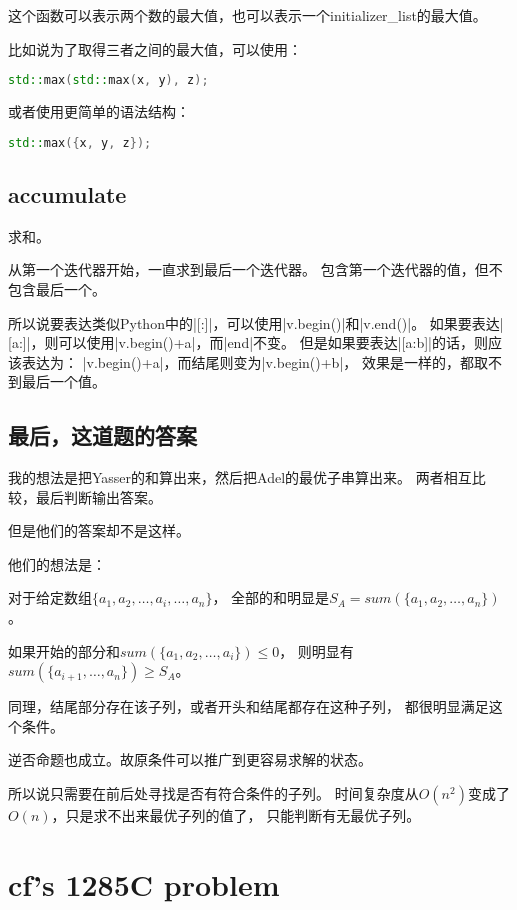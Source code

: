 这个函数可以表示两个数的最大值，也可以表示一个initializer\_list的最大值。

比如说为了取得三者之间的最大值，可以使用：
\begin{lstlisting}[language=C++]
std::max(std::max(x, y), z);
\end{lstlisting}
或者使用更简单的语法结构：
\begin{lstlisting}[language=C++]
std::max({x, y, z});
\end{lstlisting}

\subsection{accumulate}
求和。

从第一个迭代器开始，一直求到最后一个迭代器。
包含第一个迭代器的值，但不包含最后一个。

所以说要表达类似Python中的\vb|[:]|，可以使用\vb|v.begin()|和\vb|v.end()|。
如果要表达\vb|[a:]|，则可以使用\vb|v.begin()+a|，而\vb|end|不变。
但是如果要表达\vb|[a:b]|的话，则应该表达为：
\vb|v.begin()+a|，而结尾则变为\vb|v.begin()+b|，
效果是一样的，都取不到最后一个值。

\subsection{最后，这道题的答案}
我的想法是把Yasser的和算出来，然后把Adel的最优子串算出来。
两者相互比较，最后判断输出答案。

但是他们的答案却不是这样。

他们的想法是：

对于给定数组$\{a_1, a_2, \ldots, a_i, \ldots, a_n\}$，
全部的和明显是$S_A = sum(\{a_1, a_2, \ldots, a_n\})$。

如果开始的部分和$sum(\{a_1, a_2, \ldots, a_i\}) \le 0$，
则明显有$sum(\{a_{i+1}, \ldots, a_n\}) \ge S_A$。

同理，结尾部分存在该子列，或者开头和结尾都存在这种子列，
都很明显满足这个条件。

逆否命题也成立。故原条件可以推广到更容易求解的状态。

所以说只需要在前后处寻找是否有符合条件的子列。
时间复杂度从$O(n^2)$变成了$O(n)$，只是求不出来最优子列的值了，
只能判断有无最优子列。


\section{cf's 1285C problem}

